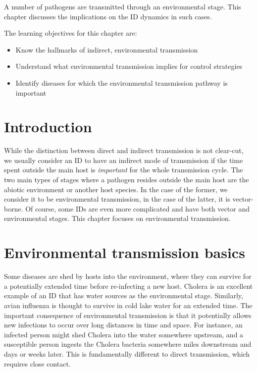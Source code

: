 \documentclass[]{book}
\providecommand{\tightlist}{%
  \setlength{\itemsep}{0pt}\setlength{\parskip}{0pt}}
\theoremstyle{definition}
\theoremstyle{definition}
\theoremstyle{definition}
\theoremstyle{remark}
\begin{document}
A number of pathogens are transmitted through an environmental stage.
This chapter discusses the implications on the ID dynamics in such
cases.

The learning objectives for this chapter are:

\begin{itemize}
\tightlist
\item
  Know the hallmarks of indirect, environmental transmission
\item
  Understand what environmental transmission implies for control
  strategies
\item
  Identify diseases for which the environmental transmission pathway is
  important
\end{itemize}

\section{Introduction}\label{introduction-6}

While the distinction between direct and indirect transmission is not
clear-cut, we usually consider an ID to have an indirect mode of
transmission if the time spent outside the main host is \emph{important}
for the whole transmission cycle. The two main types of stages where a
pathogen resides outside the main host are the abiotic environment or
another host species. In the case of the former, we consider it to be
environmental transmission, in the case of the latter, it is
vector-borne. Of course, some IDs are even more complicated and have
both vector and environmental stages. This chapter focuses on
environmental transmission.

\section{Environmental transmission
basics}\label{environmental-transmission-basics}

Some diseases are shed by hosts into the environment, where they can
survive for a potentially extended time before re-infecting a new host.
Cholera is an excellent example of an ID that has water sources as the
environmental stage. Similarly, avian influenza is thought to survive in
cold lake water for an extended time. The important consequence of
environmental transmission is that it potentially allows new infections
to occur over long distances in time and space. For instance, an
infected person might shed Cholera into the water somewhere upstream,
and a susceptible person ingests the Cholera bacteria somewhere miles
downstream and days or weeks later. This is fundamentally different to
direct transmission, which requires close contact.
\end{document}
